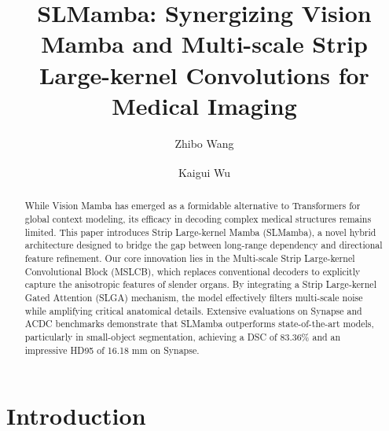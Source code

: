 \documentclass[runningheads]{llncs}
\begin{document}
%
\title{SLMamba: Synergizing Vision Mamba and Multi-scale Strip Large-kernel Convolutions for Medical Imaging}

%
%
\author{Zhibo Wang\and
Kaigui Wu\textsuperscript{\Letter} }
%
%
%
\maketitle              %
%




\begin{abstract}

While Vision Mamba has emerged as a formidable alternative to Transformers for global context modeling, its efficacy in decoding complex medical structures remains limited. This paper introduces Strip Large-kernel Mamba (SLMamba), a novel hybrid architecture designed to bridge the gap between long-range dependency and directional feature refinement. Our core innovation lies in the Multi-scale Strip Large-kernel Convolutional Block (MSLCB), which replaces conventional decoders to explicitly capture the anisotropic features of slender organs. By integrating a Strip Large-kernel Gated Attention (SLGA) mechanism, the model effectively filters multi-scale noise while amplifying critical anatomical details. Extensive evaluations on Synapse and ACDC benchmarks demonstrate that SLMamba outperforms state-of-the-art models, particularly in small-object segmentation, achieving a DSC of 83.36\% and an impressive HD95 of 16.18 mm on Synapse.


\end{abstract}



\section{Introduction}
\end{document}
